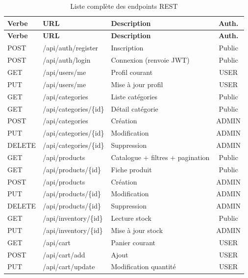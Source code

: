 \documentclass[11pt,a4paper,oneside]{report}
\begin{document}
\begin{longtable}{p{1.2cm}p{4.5cm}p{6cm}c}
\caption{Liste complète des endpoints REST}\label{tab:endpoints-full}\\
\toprule
\textbf{Verbe} & \textbf{URL} & \textbf{Description} & \textbf{Auth.}\\
\midrule
\endfirsthead
\toprule
\textbf{Verbe} & \textbf{URL} & \textbf{Description} & \textbf{Auth.}\\
\midrule
\endhead
POST   & /api/auth/register     & Inscription                  & Public \\
POST   & /api/auth/login        & Connexion (renvoie JWT)      & Public \\
GET    & /api/users/me          & Profil courant               & USER \\
PUT    & /api/users/me          & Mise à jour profil           & USER \\
GET    & /api/categories        & Liste catégories             & Public \\
GET    & /api/categories/\{id\} & Détail catégorie             & Public \\
POST   & /api/categories        & Création                     & ADMIN \\
PUT    & /api/categories/\{id\} & Modification                 & ADMIN \\
DELETE & /api/categories/\{id\} & Suppression                  & ADMIN \\
GET    & /api/products          & Catalogue + filtres + pagination & Public \\
GET    & /api/products/\{id\}   & Fiche produit                & Public \\
POST   & /api/products          & Création                     & ADMIN \\
PUT    & /api/products/\{id\}   & Modification                 & ADMIN \\
DELETE & /api/products/\{id\}   & Suppression                  & ADMIN \\
GET    & /api/inventory/\{id\}  & Lecture stock                & Public \\
PUT    & /api/inventory/\{id\}  & Mise à jour stock            & ADMIN \\
GET    & /api/cart              & Panier courant               & USER \\
POST   & /api/cart/add          & Ajout                        & USER \\
PUT    & /api/cart/update       & Modification quantité        & USER \\

\end{longtable}
\end{document}
